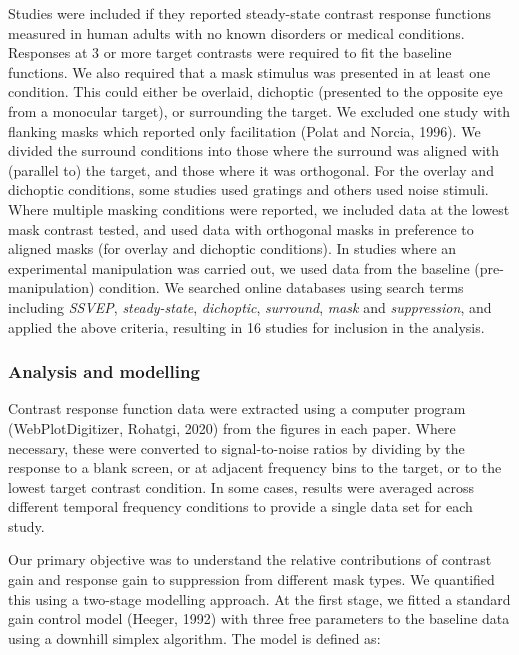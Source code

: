 \documentclass[]{article}
\begin{document}
Studies were included if they reported steady-state contrast response functions measured in human adults with no known disorders or medical conditions. Responses at 3 or more target contrasts were required to fit the baseline functions. We also required that a mask stimulus was presented in at least one condition. This could either be overlaid, dichoptic (presented to the opposite eye from a monocular target), or surrounding the target. We excluded one study with flanking masks which reported only facilitation (Polat and Norcia, 1996). We divided the surround conditions into those where the surround was aligned with (parallel to) the target, and those where it was orthogonal. For the overlay and dichoptic conditions, some studies used gratings and others used noise stimuli. Where multiple masking conditions were reported, we included data at the lowest mask contrast tested, and used data with orthogonal masks in preference to aligned masks (for overlay and dichoptic conditions). In studies where an experimental manipulation was carried out, we used data from the baseline (pre-manipulation) condition. We searched online databases using search terms including \emph{SSVEP}, \emph{steady-state}, \emph{dichoptic}, \emph{surround}, \emph{mask} and \emph{suppression}, and applied the above criteria, resulting in 16 studies for inclusion in the analysis.

\hypertarget{analysis-and-modelling}{%
\subsubsection{Analysis and modelling}\label{analysis-and-modelling}}

Contrast response function data were extracted using a computer program (WebPlotDigitizer, Rohatgi, 2020) from the figures in each paper. Where necessary, these were converted to signal-to-noise ratios by dividing by the response to a blank screen, or at adjacent frequency bins to the target, or to the lowest target contrast condition. In some cases, results were averaged across different temporal frequency conditions to provide a single data set for each study.

Our primary objective was to understand the relative contributions of contrast gain and response gain to suppression from different mask types. We quantified this using a two-stage modelling approach. At the first stage, we fitted a standard gain control model (Heeger, 1992) with three free parameters to the baseline data using a downhill simplex algorithm. The model is defined as:
\end{document}
